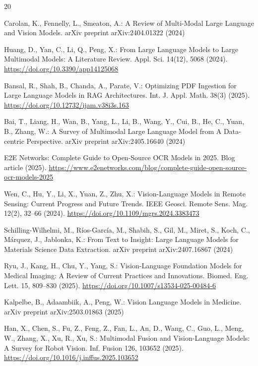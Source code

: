 \documentclass{svproc}
\begin{document}
\begin{thebibliography}{20}

Carolan, K., Fennelly, L., Smeaton, A.: A Review of Multi-Modal Large Language and Vision Models. arXiv preprint arXiv:2404.01322 (2024)

Huang, D., Yan, C., Li, Q., Peng, X.: From Large Language Models to Large Multimodal Models: A Literature Review. Appl. Sci. 14(12), 5068 (2024). \url{https://doi.org/10.3390/app14125068}

Bansal, R., Shah, B., Chanda, A., Parate, V.: Optimizing PDF Ingestion for Large Language Models in RAG Architectures. Int. J. Appl. Math. 38(3) (2025). \url{https://doi.org/10.12732/ijam.v38i3s.163}

Bai, T., Liang, H., Wan, B., Yang, L., Li, B., Wang, Y., Cui, B., He, C., Yuan, B., Zhang, W.: A Survey of Multimodal Large Language Model from A Data-centric Perspective. arXiv preprint arXiv:2405.16640 (2024)

E2E Networks: Complete Guide to Open-Source OCR Models in 2025. Blog article (2025). \url{https://www.e2enetworks.com/blog/complete-guide-open-source-ocr-models-2025}

Wen, C., Hu, Y., Li, X., Yuan, Z., Zhu, X.: Vision-Language Models in Remote Sensing: Current Progress and Future Trends. IEEE Geosci. Remote Sens. Mag. 12(2), 32--66 (2024). \url{https://doi.org/10.1109/mgrs.2024.3383473}

Schilling-Wilhelmi, M., Ríos-García, M., Shabih, S., Gil, M., Miret, S., Koch, C., Márquez, J., Jablonka, K.: From Text to Insight: Large Language Models for Materials Science Data Extraction. arXiv preprint arXiv:2407.16867 (2024)

Ryu, J., Kang, H., Chu, Y., Yang, S.: Vision-Language Foundation Models for Medical Imaging: A Review of Current Practices and Innovations. Biomed. Eng. Lett. 15, 809--830 (2025). \url{https://doi.org/10.1007/s13534-025-00484-6}

Kalpelbe, B., Adaambiik, A., Peng, W.: Vision Language Models in Medicine. arXiv preprint arXiv:2503.01863 (2025)

Han, X., Chen, S., Fu, Z., Feng, Z., Fan, L., An, D., Wang, C., Guo, L., Meng, W., Zhang, X., Xu, R., Xu, S.: Multimodal Fusion and Vision-Language Models: A Survey for Robot Vision. Inf. Fusion 126, 103652 (2025). \url{https://doi.org/10.1016/j.inffus.2025.103652}


\end{thebibliography}
\end{document}

